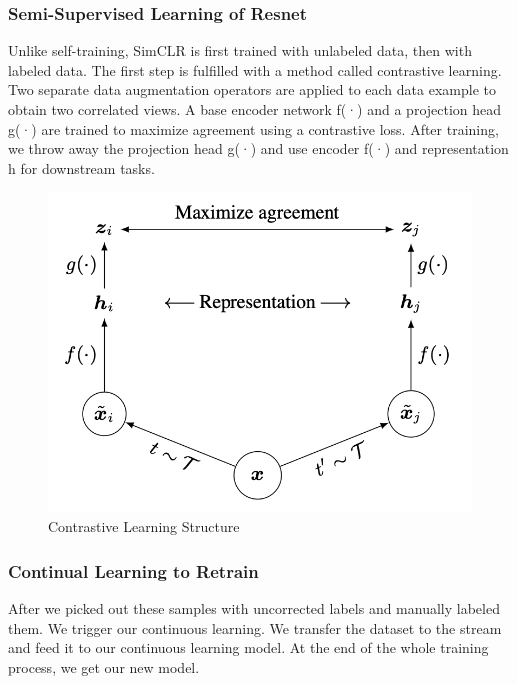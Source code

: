\documentclass[lang=english,inputenc=utf8,fontsize=10pt]{ldvarticle}
\begin{document}


\subsubsection{Semi-Supervised Learning of Resnet}
Unlike self-training, SimCLR is first trained with unlabeled data, then with labeled data. The first step is fulfilled with a method called contrastive learning. Two separate data augmentation operators are applied to each data example to obtain two correlated views. A base encoder network f(·) and a projection head g(·) are trained to maximize agreement using a contrastive loss. After training, we throw away the projection head g(·) and use encoder f(·) and representation h for downstream tasks.
\begin{figure}[h]
    \centering
    \includegraphics[scale=0.3]{Semi.png}
    \caption{Contrastive Learning Structure}
    \label{Semi structure}
\end{figure}

\subsubsection{Continual Learning to Retrain}
After we picked out these samples with uncorrected labels and manually labeled them. We trigger our continuous learning. We transfer the dataset to the stream and feed it to our continuous learning model. At the end of the whole training process, we get our new model.\\
\end{document}
